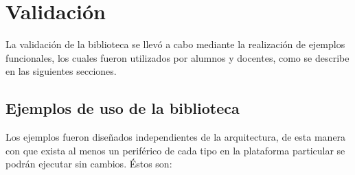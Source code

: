 \section{Validación}
\label{sec:validacion}

La validación de la biblioteca se llevó a cabo mediante la realización de ejemplos funcionales, los cuales fueron utilizados por alumnos y docentes, como se describe en las siguientes secciones.

\subsection{Ejemplos de uso de la biblioteca}
\label{sec:libExamples}

Los ejemplos fueron diseñados independientes de la arquitectura, de esta manera con que exista al menos un periférico de cada tipo en la plataforma particular se podrán ejecutar sin cambios. Éstos son:

